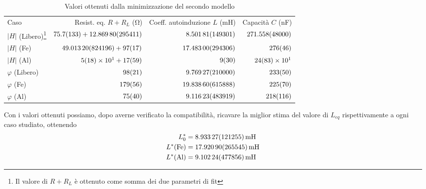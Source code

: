 \documentclass[
    prl,
    floatfix,
    reprint, 
    superscriptaddress, 
    altaffilletter, 
    amsmath, 
    amssymb, 
    a4paper]{revtex4-2}
\begin{document}
\begin{table}[h!]
    \begin{ruledtabular}
        \caption{Valori ottenuti dalla minimizzazione del secondo modello}
        \label{tab:val_RLC_2}
        \begin{tabular}{lrrr}
            Caso & Resist. eq. $R+R_L$ (\unit{\ohm}) & Coeff. autoinduzione $L$ (\unit{\milli\henry}) & Capacità $C$ (\unit{\nano\farad}) \\
            \colrule
            $|H|$ (Libero)\footnote[1]{Il valore di $R+R_L$ è ottenuto come somma dei due parametri di fit}
                 & $\num[round-precision=1]{75.7 +- 13.3} + \num{12.8698 +- 2.95411}$ & $\num{8.50181 +- 1.49301}$ & $\num[round-precision=1]{271.558 +- 48}$ \\
            $|H|$ (Fe)\footnotemark[1]     & $\num{49.0132 +- 8.24196} + \num[round-mode=none]{97 +- 17}$ & $\num{17.483 +- 2.94306}$ & $\num[round-mode=none]{276 +- 46}$ \\
            $|H|$ (Al)\footnotemark[1]     & $\num[round-mode=none]{5 +- 18e1} + \num[round-mode=none]{17 +- 59}$ & $\num[round-mode=none]{9 +- 30}$ & $\num[round-mode=none]{24 +- 83e1}$ \\
            $\varphi$ (Libero) & $\num[round-mode=none]{98 +- 21}$ & $\num{9.76927 +- 2.1}$ & $\num[round-mode=none]{233 +- 50}$ \\
            $\varphi$ (Fe) & $\num[round-mode=none]{179 +- 56}$ & $\num{19.8386 +- 6.15888}$ & $\num[round-mode=none]{225 +- 70}$ \\
            $\varphi$ (Al) & $\num[round-mode=none]{75 +- 40}$ & $\num{9.11623 +- 4.83919}$ & $\num[round-mode=none]{218 +- 116}$ \\
            
        \end{tabular}
    \end{ruledtabular}
\end{table}

Con i valori ottenuti possiamo, dopo averne verificato la compatibilità, ricavare la miglior stima del valore di $L_{eq}$ rispettivamente a ogni caso studiato, ottenendo
\begin{align*}
    L_0^*            &= \SI{8.93327 +- 1.21255}{\milli\henry} \\
    L^* (\text{Fe})  &= \SI{17.9209 +- 2.65545}{\milli\henry}\\
    L^* (\text{Al})  &= \SI{9.10224 +- 4.77856}{\milli\henry}\\
\end{align*}
\end{document}

